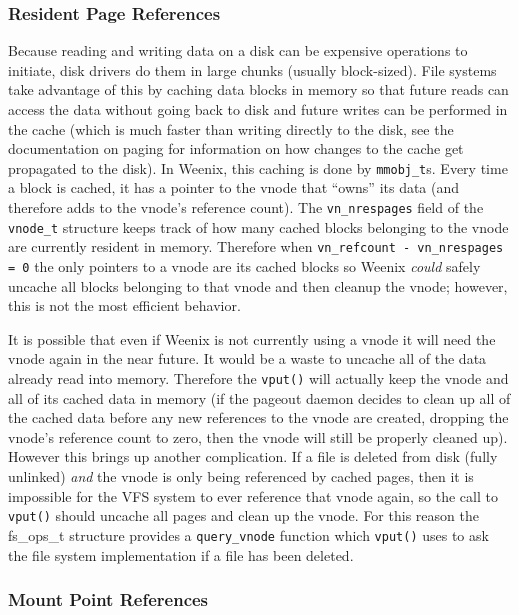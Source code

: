 \subsubsection{Resident Page References}


Because reading and writing data on a disk can be expensive operations to initiate, disk drivers do them in large chunks (usually block-sized). File systems take advantage of this by caching data blocks in memory so that future reads can access the data without going back to disk and future writes can be performed in the cache (which is much faster than writing directly to the disk, see the documentation on paging for information on how changes to the cache get propagated to the disk). In Weenix, this caching is done by \texttt{mmobj\_t}s. Every time a block is cached, it has a pointer to the vnode that ``owns'' its data (and therefore adds to the vnode's reference count). The \texttt{vn\_nrespages} field of the \texttt{vnode\_t} structure keeps track of how many cached blocks belonging to the vnode are currently resident in memory. Therefore when \texttt{vn\_refcount - vn\_nrespages = 0} the only pointers to a vnode are its cached blocks so Weenix \emph{could} safely uncache all blocks belonging to that vnode and then cleanup the vnode; however, this is not the most efficient behavior.

It is possible that even if Weenix is not currently using a vnode it will need the vnode again in the near future. It would be a waste to uncache all of the data already read into memory. Therefore the \texttt{vput()} will actually keep the vnode and all of its cached data in memory (if the pageout daemon decides to clean up all of the cached data before any new references to the vnode are created, dropping the vnode's reference count to zero, then the vnode will still be properly cleaned up). However this brings up another complication. If a file is deleted from disk (fully unlinked) \emph{and} the vnode is only being referenced by cached pages, then it is impossible for the VFS system to ever reference that vnode again, so the call to \texttt{vput()} should uncache all pages and clean up the vnode. For this reason the fs\_ops\_t structure provides a \texttt{query\_vnode} function which \texttt{vput()} uses to ask the file system implementation if a file has been deleted.

\subsubsection{Mount Point References}

